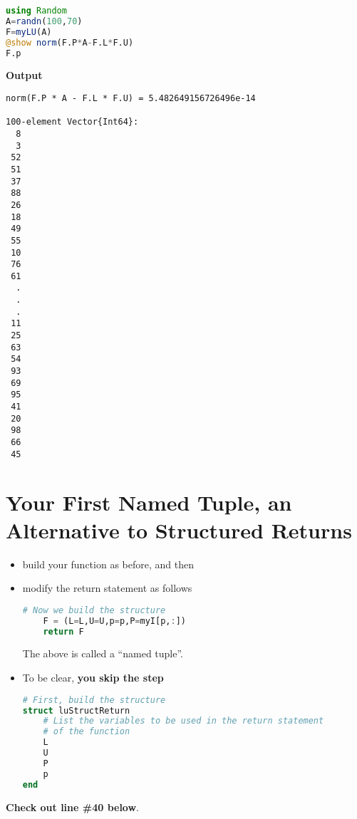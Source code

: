 \begin{lstlisting}[language=Julia,style=mystyle]
using Random
A=randn(100,70)
F=myLU(A)
@show norm(F.P*A-F.L*F.U)
F.p
\end{lstlisting}
\textbf{Output} 
\begin{verbatim}
norm(F.P * A - F.L * F.U) = 5.482649156726496e-14

100-element Vector{Int64}:
  8
  3
 52
 51
 37
 88
 26
 18
 49
 55
 10
 76
 61
  .
  .
  .
 11
 25
 63
 54
 93
 69
 95
 41
 20
 98
 66
 45
\end{verbatim}

\section{Your First Named Tuple, an Alternative to Structured Returns}

\begin{tcolorbox}[
title=\textcolor{red}{\Large \bf Alternative Method to Build a Structured Return via a Named Tuple}]

\begin{itemize}
    \item build your function as before, and then 
    \item modify the return statement as follows 
\begin{lstlisting}[language=Julia,style=mystyle]
    # Now we build the structure
    F = (L=L,U=U,p=p,P=myI[p,:])
    return F
\end{lstlisting}
The above is called a ``named tuple''.
\item To be clear, \textbf{you skip the step}
\begin{lstlisting}[language=Julia,style=mystyle]
# First, build the structure
struct luStructReturn
    # List the variables to be used in the return statement
    # of the function
    L
    U
    P
    p
end
\end{lstlisting}
\end{itemize}
\end{tcolorbox}

\textbf{Check out line \#40 below}.\\


